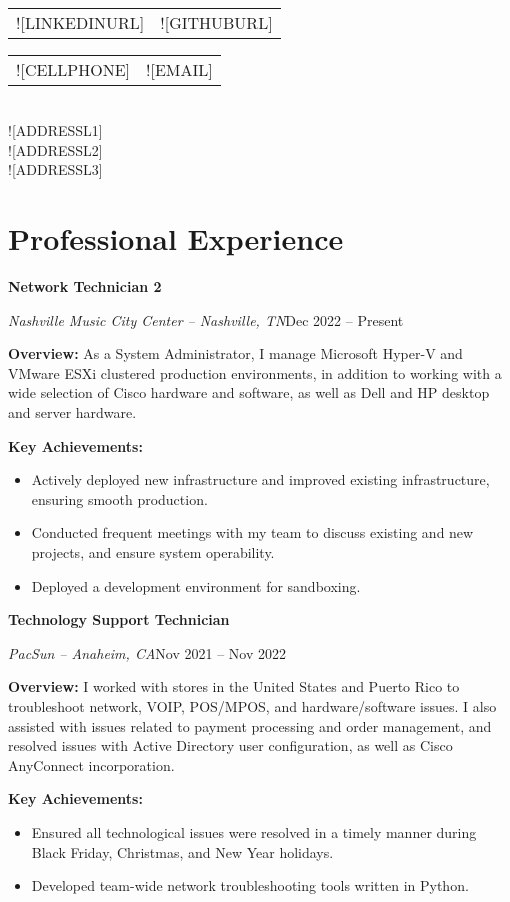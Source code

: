 \documentclass[a4paper]{article}
\makeatletter
\renewcommand{\maketitle}{
  \begin{widebox}
    {\huge\bfseries\textsf\theauthor} \\
    \medskip{}
    \begin{tabular}{@{}c|c@{}}
        \faIcon{linkedin} \textsf{![LINKEDINURL]} & \faIcon{github} \textsf{![GITHUBURL]}
    \end{tabular}
    \begin{tabular}{@{}c|c@{}}
        \faIcon{mobile} \textsf{![CELLPHONE]} & \faIcon{envelope} \textsf{![EMAIL]}
    \end{tabular} \\
    \medskip{}
    \faIcon{home} \textsf{![ADDRESSL1]} \\
    \textsf{![ADDRESSL2]} \\
    \textsf{![ADDRESSL3]}
  \end{widebox}
}
\makeatother
\begin{document}
\author{\textsf{![FIRSTNAME] ![LASTNAME]}}

\maketitle

\section{Professional Experience}
\begin{minipage}{\textwidth}
\textbf{Network Technician 2}\par
\textit{Nashville Music City Center -- Nashville, TN}\hfill Dec 2022 -- Present

\medskip
\textbf{Overview:} As a System Administrator, I manage Microsoft Hyper-V and VMware ESXi clustered production environments, in addition to working with a wide selection of Cisco hardware and software, as well as Dell and HP desktop and server hardware.

\medskip
\textbf{Key Achievements:} 
\begin{itemize}
    \item Actively deployed new infrastructure and improved existing infrastructure, ensuring smooth production.
    \item Conducted frequent meetings with my team to discuss existing and new projects, and ensure system operability.
    \item Deployed a development environment for sandboxing.
\end{itemize}
\end{minipage}

\vspace{10pt}
\begin{minipage}{\textwidth}
\textbf{Technology Support Technician}\par
\textit{PacSun -- Anaheim, CA}\hfill Nov 2021 -- Nov 2022

\medskip
\textbf{Overview:} I worked with stores in the United States and Puerto Rico to troubleshoot network, VOIP, POS/MPOS, and hardware/software issues. I also assisted with issues related to payment processing and order management, and resolved issues with Active Directory user configuration, as well as Cisco AnyConnect incorporation.

\medskip
\textbf{Key Achievements:}
\begin{itemize}
    \item Ensured all technological issues were resolved in a timely manner during Black Friday, Christmas, and New Year holidays.
    \item Developed team-wide network troubleshooting tools written in Python.
\end{itemize}
\end{minipage}
\end{document}
